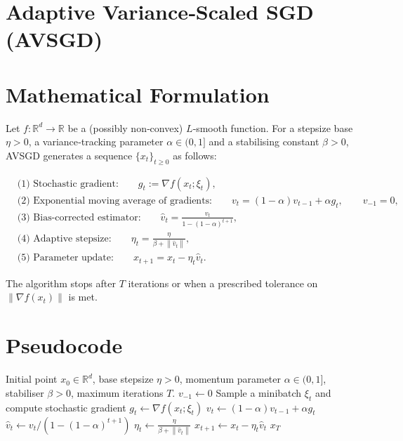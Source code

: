 \documentclass{article}
\newcommand{\norm}[1]{\left\|#1\right\|}
\newcommand{\grad}{\nabla}
\begin{document}
\section*{Adaptive Variance‑Scaled SGD (AVSGD)}

\section*{Mathematical Formulation}
Let $f:\mathbb{R}^{d}\rightarrow\mathbb{R}$ be a (possibly non‑convex) $L$‑smooth function.  
For a stepsize base $\eta>0$, a variance‑tracking parameter $\alpha\in(0,1]$ and a stabilising constant $\beta>0$, AVSGD generates a sequence $\{x_t\}_{t\ge 0}$ as follows:

\[
\begin{aligned}
&\text{(1) Stochastic gradient:}\qquad g_t:=\grad f(x_t;\xi_t), \\[4pt]
&\text{(2) Exponential moving average of gradients:}\qquad 
v_t = (1-\alpha)v_{t-1}+\alpha g_t,\qquad v_{-1}=0, \\[4pt]
&\text{(3) Bias‑corrected estimator:}\qquad 
\hat v_t = \frac{v_t}{1-(1-\alpha)^{t+1}}, \\[4pt]
&\text{(4) Adaptive stepsize:}\qquad 
\eta_t = \frac{\eta}{\beta+\norm{\hat v_t}}, \\[4pt]
&\text{(5) Parameter update:}\qquad 
x_{t+1}=x_t-\eta_t \hat v_t .
\end{aligned}
\]

The algorithm stops after $T$ iterations or when a prescribed tolerance on $\norm{\grad f(x_t)}$ is met.

\section*{Pseudocode}
\begin{algorithm}[H]
\caption{Adaptive Variance‑Scaled SGD (AVSGD)}
\begin{algorithmic}[1]
\Require Initial point $x_0\in\mathbb{R}^d$, base stepsize $\eta>0$, 
        momentum parameter $\alpha\in(0,1]$, stabiliser $\beta>0$, 
        maximum iterations $T$.
\State $v_{-1}\gets 0$ 
    \State Sample a minibatch $\xi_t$ and compute stochastic gradient $g_t\gets \grad f(x_t;\xi_t)$
    \State $v_t \gets (1-\alpha)v_{t-1}+\alpha g_t$
    \State $\hat v_t \gets v_t/(1-(1-\alpha)^{t+1})$ 
    \State $\eta_t \gets \displaystyle \frac{\eta}{\beta+\norm{\hat v_t}}$
    \State $x_{t+1}\gets x_t-\eta_t \hat v_t$
\EndFor
\State \Return $x_T$
\end{algorithmic}
\end{algorithm}
\end{document}
